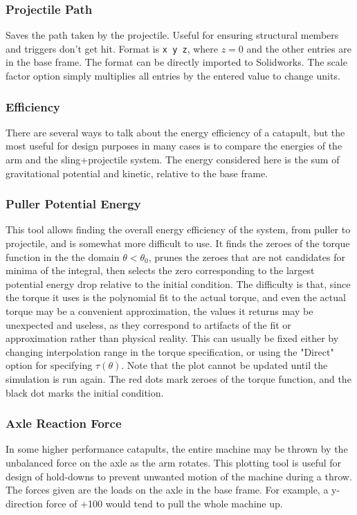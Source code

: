 \documentclass{article}
\begin{document}
\subsubsection{Projectile Path} Saves the path taken by the projectile. Useful for ensuring structural members and triggers don't get hit. Format is \verb|x y z|, where $z=0$ and the other entries are in the base frame. The format can be directly imported to Solidworks. The scale factor option simply multiplies all entries by the entered value to change units.
\subsubsection{Efficiency} There are several ways to talk about the energy efficiency of a catapult, but the most useful for design purposes in many cases is to compare the energies of the arm and the sling+projectile system. The energy considered here is the sum of gravitational potential and kinetic, relative to the base frame.
\subsubsection{Puller Potential Energy} This tool allows finding the overall energy efficiency of the system, from puller to projectile, and is somewhat more difficult to use. It finds the zeroes of the torque function in the the domain $\theta < \theta_0$, prunes the zeroes that are not candidates for minima of the integral, then selects the zero corresponding to the largest potential energy drop relative to the initial condition. The difficulty is that, since the torque it uses is the polynomial fit to the actual torque, and even the actual torque may be a convenient approximation, the values it returns may be unexpected and useless, as they correspond to artifacts of the fit or approximation rather than physical reality. This can usually be fixed either by changing interpolation range in the torque specification, or using the "Direct" option for specifying $\tau(\theta)$. Note that the plot cannot be updated until the simulation is run again. The red dots mark zeroes of the torque function, and the black dot marks the initial condition.
\subsubsection{Axle Reaction Force} In some higher performance catapults, the entire machine may be thrown by the unbalanced force on the axle as the arm rotates. This plotting tool is useful for design of hold-downs to prevent unwanted motion of the machine during a throw. The forces given are the loads on the axle in the base frame. For example, a y-direction force of +100 would tend to pull the whole machine up.
\end{document}
